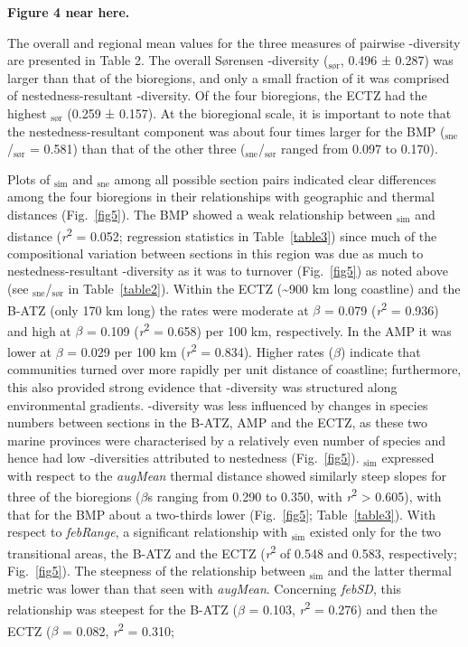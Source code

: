\documentclass[utf8]{frontiersSCNS} %
\begin{document}
\textbf{Figure 4 near here.}

The overall and regional mean values for the three measures of pairwise \textbeta-diversity are presented in Table 2. The overall Sørensen \textbeta-diversity (\textbeta$_{\text{sør}}$, 0.496 ± 0.287) was larger than that of the bioregions, and only a small fraction of it was comprised of nestedness-resultant \textbeta-diversity. Of the four bioregions, the ECTZ had the highest \textbeta$_{\text{sør}}$ (0.259 ± 0.157). At the bioregional scale, it is important to note that the nestedness-resultant component was about four times larger for the BMP (\textbeta$_{\text{sne}}$/\textbeta$_{\text{sør}}$ = 0.581) than that of the other three (\textbeta$_{\text{sne}}$/\textbeta$_{\text{sør}}$ ranged from 0.097 to 0.170).

Plots of \textbeta$_{\text{sim}}$ and \textbeta$_{\text{sne}}$ among all possible section pairs indicated clear differences among the four bioregions in their relationships with geographic and thermal distances (Fig.~\ref{fig5}). The BMP showed a weak relationship between \textbeta$_{\text{sim}}$ and distance (\emph{r}\textsuperscript{2} = 0.052; regression statistics in Table~\ref{table3}) since much of the compositional variation between sections in this region was due as much to nestedness-resultant \textbeta-diversity as it was to turnover (Fig.~\ref{fig5}) as noted above (see \textbeta$_{\text{sne}}$/\textbeta$_{\text{sør}}$ in Table~\ref{table2}). Within the ECTZ (\textasciitilde{}900 km long coastline) and the B-ATZ (only 170 km long) the rates were moderate at $\beta$ = 0.079 (\emph{r}\textsuperscript{2} = 0.936) and high at $\beta$ = 0.109 (\emph{r}\textsuperscript{2} = 0.658) per 100 km, respectively. In the AMP it was lower at $\beta$ = 0.029 per 100 km (\emph{r}\textsuperscript{2} = 0.834). Higher rates ($\beta$) indicate that communities turned over more rapidly per unit distance of coastline; furthermore, this also provided strong evidence that \textbeta-diversity was structured along environmental gradients. \textbeta-diversity was less influenced by changes in species numbers between sections in the B-ATZ, AMP and the ECTZ, as these two marine provinces were characterised by a relatively even number of species and hence had low \textbeta-diversities attributed to nestedness (Fig.~\ref{fig5}). \textbeta$_{\text{sim}}$ expressed with respect to the \emph{augMean} thermal distance showed similarly steep slopes for three of the bioregions ($\beta$s ranging from 0.290 to 0.350, with \emph{r}\textsuperscript{2} \textgreater{} 0.605), with that for the BMP about a two-thirds lower (Fig.~\ref{fig5}; Table~\ref{table3}). With respect to \emph{febRange}, a significant relationship with \textbeta$_{\text{sim}}$ existed only for the two transitional areas, the B-ATZ and the ECTZ (\emph{r}\textsuperscript{2} of 0.548 and 0.583, respectively; Fig.~\ref{fig5}). The steepness of the relationship between \textbeta$_{\text{sim}}$ and the latter thermal metric was lower than that seen with \emph{augMean}. Concerning \emph{febSD}, this relationship was steepest for the B-ATZ ($\beta$ = 0.103, \emph{r}\textsuperscript{2} = 0.276) and then the ECTZ ($\beta$ = 0.082, \emph{r}\textsuperscript{2} = 0.310; 
\end{document}
